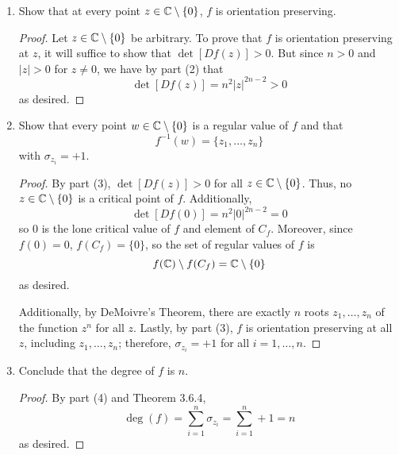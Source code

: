 \documentclass[../psets.tex]{subfiles}
\begin{document}
\begin{enumerate}[label={\textbf{3.6.\roman*.}}]
\begin{enumerate}
\begin{proof}
            \begin{equation*}
                \det(Df(z)) = |nz^{n-1}|^2
                = n^2|z^{n-1}|^2
                = n^2|z^{2n-2}|
                = n^2|z|^{2n-2}
            \end{equation*}
            as desired.
        \end{proof}
        \item Show that at every point $z\in\mathbb{C}\setminus\{0\}$, $f$ is orientation preserving.
        \begin{proof}
            Let $z\in\mathbb{C}\setminus\{0\}$ be arbitrary. To prove that $f$ is orientation preserving at $z$, it will suffice to show that $\det[Df(z)]>0$. But since $n>0$ and $|z|>0$ for $z\neq 0$, we have by part (2) that
            \begin{equation*}
                \det[Df(z)] = n^2|z|^{2n-2}
                > 0
            \end{equation*}
            as desired.
        \end{proof}
        \item Show that every point $w\in\mathbb{C}\setminus\{0\}$ is a regular value of $f$ and that
        \begin{equation*}
            f^{-1}(w) = \{z_1,\dots,z_n\}
        \end{equation*}
        with $\sigma_{z_i}=+1$.
        \begin{proof}
            By part (3), $\det[Df(z)]>0$ for all $z\in\mathbb{C}\setminus\{0\}$. Thus, no $z\in\mathbb{C}\setminus\{0\}$ is a critical point of $f$. Additionally,
            \begin{equation*}
                \det[Df(0)] = n^2|0|^{2n-2}
                = 0
            \end{equation*}
            so 0 is the lone critical value of $f$ and element of $C_f$. Moreover, since $f(0)=0$, $f(C_f)=\{0\}$, so the set of regular values of $f$ is
            \begin{equation*}
                f(\mathbb{C})\setminus f(C_f) = \mathbb{C}\setminus\{0\}
            \end{equation*}
            as desired.\par
            Additionally, by DeMoivre's Theorem, there are exactly $n$ roots $z_1,\dots,z_n$ of the function $z^n$ for all $z$. Lastly, by part (3), $f$ is orientation preserving at all $z$, including $z_1,\dots,z_n$; therefore, $\sigma_{z_i}=+1$ for all $i=1,\dots,n$.
        \end{proof}
        \item Conclude that the degree of $f$ is $n$.
        \begin{proof}
            By part (4) and Theorem 3.6.4,
            \begin{equation*}
                \deg(f) = \sum_{i=1}^n\sigma_{z_i}
                = \sum_{i=1}^n+1
                = n
            \end{equation*}
            as desired.
        \end{proof}
    \end{enumerate}
\end{enumerate}
\end{document}
